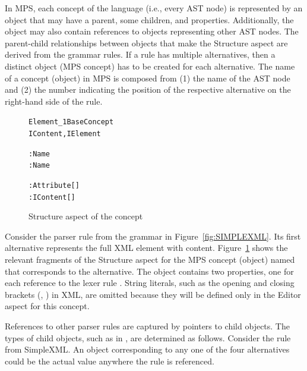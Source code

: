 In MPS, each concept of the language (i.e., every AST node) is represented by an object that may have a parent, some children, and properties.
Additionally, the object may also contain references to objects representing other AST nodes.
The parent-child relationships between objects that make the Structure aspect are derived from the grammar rules.
If a rule has multiple alternatives, then a distinct object (MPS concept) has to be created for each alternative.
The name of a concept (object) in MPS is composed from (1) the name of the AST node and (2) the number indicating the position of the respective alternative on the right-hand side of the rule.

\begin{figure}[ht]
\vspace{-3mm}
\centering
\begin{alltt}
\small
{} Element\_1  BaseConcept
         IContent, IElement

   : Name
   : Name
  
   : Attribute[]
     : IContent[]
\end{alltt}
\caption{Structure aspect of the  concept}
\label{fig:ELEMENTSTRUCT}
\vspace{-2mm}
\end{figure}

Consider the parser rule  from the grammar in Figure~\ref{fig:SIMPLEXML}.
Its first alternative represents the full XML element with content.
Figure~\ref{fig:ELEMENTSTRUCT} shows the relevant fragments of the Structure aspect for the MPS concept (object) named  that corresponds to the alternative.
The object contains two properties, one for each reference to the lexer rule .
String literals, such as the opening and closing brackets (\antlrliteral{\textless}, \antlrliteral{/\textgreater}) in XML, are omitted because they will be defined only in the Editor aspect for this concept.

References to other parser rules are captured by pointers to child objects.
The types of child objects, such as  in , are determined as follows.
Consider the  rule from SimpleXML.
An object corresponding to any one of the four alternatives could be the actual value anywhere the  rule is referenced.

